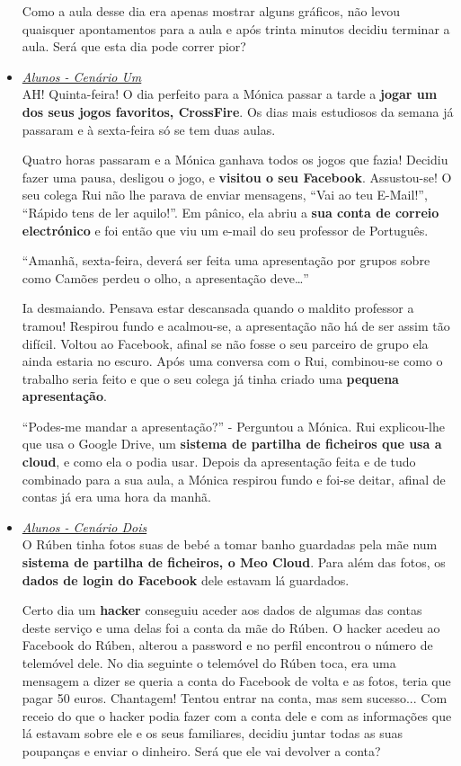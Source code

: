 \begin{itemize}
Como a aula desse dia era apenas mostrar alguns gráficos, não levou quaisquer apontamentos para a aula e após trinta minutos decidiu terminar a aula. Será que esta dia pode correr pior?

\item \textit{\underline{Alunos - Cenário Um}}\\

AH! Quinta-feira! O dia perfeito para a Mónica passar a tarde a \textbf{jogar um dos seus jogos favoritos, CrossFire}. Os dias mais estudiosos da semana já passaram e à sexta-feira só se tem duas aulas.

Quatro horas passaram e a Mónica ganhava todos os jogos que fazia! Decidiu fazer uma pausa, desligou o jogo, e \textbf{visitou o seu Facebook}. Assustou-se! O seu colega Rui não lhe parava de enviar mensagens, “Vai ao teu E-Mail!”, “Rápido tens de ler aquilo!”. Em pânico, ela abriu a \textbf{sua conta de correio electrónico} e foi então que viu um e-mail do seu professor de Português.

“Amanhã, sexta-feira, deverá ser feita uma apresentação por grupos sobre como Camões perdeu o olho, a apresentação deve…”

Ia desmaiando. Pensava estar descansada quando o maldito professor a tramou! Respirou fundo e acalmou-se, a apresentação não há de ser assim tão difícil. Voltou ao Facebook, afinal se não fosse o seu parceiro de grupo ela ainda estaria no escuro. Após uma conversa com o Rui, combinou-se como o trabalho seria feito e que o seu colega já tinha criado uma \textbf{pequena apresentação}.

“Podes-me mandar a apresentação?” - Perguntou a Mónica.
Rui explicou-lhe que usa o Google Drive, um \textbf{sistema de partilha de ficheiros que usa a cloud}, e como ela o podia usar. Depois da apresentação feita e de tudo combinado para a sua aula, a Mónica respirou fundo e foi-se deitar, afinal de contas já era uma hora da manhã.

\item \textit{\underline{Alunos - Cenário Dois}}\\

O Rúben tinha fotos suas de bebé a tomar banho guardadas pela mãe num \textbf{sistema de partilha de ficheiros, o Meo Cloud}. Para além das fotos, os \textbf{dados de login do Facebook} dele estavam lá guardados. 

Certo dia um \textbf{hacker} conseguiu aceder aos dados de algumas das contas deste serviço e uma delas foi a conta da mãe do Rúben. O hacker acedeu ao Facebook do Rúben, alterou a password e no perfil encontrou o número de telemóvel dele. No dia seguinte o telemóvel do Rúben toca, era uma mensagem a dizer se queria a conta do Facebook de volta e as fotos, teria que pagar 50 euros. Chantagem! Tentou entrar na conta, mas sem sucesso... Com receio do que o hacker podia fazer com a conta dele e com as informações que lá estavam sobre ele e os seus familiares, decidiu juntar todas as suas poupanças e enviar o dinheiro. Será que ele vai devolver a conta?
\end{itemize}
